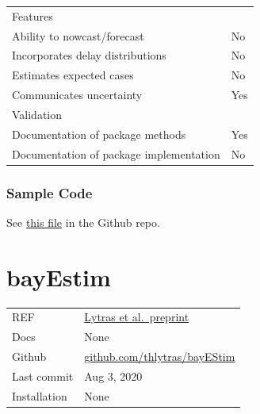 \documentclass[
  letterpaper,
  DIV=11,
  numbers=noendperiod]{scrreprt}
\begin{document}
\begin{longtable}[]{@{}
  >{\raggedright\arraybackslash}p{}
  >{\raggedright\arraybackslash}p{}@{}}
\toprule\noalign{}
\endhead
\bottomrule\noalign{}
\endlastfoot
Features & \\
Ability to nowcast/forecast & No \\
Incorporates delay distributions & No \\
Estimates expected cases & No \\
Communicates uncertainty & Yes \\
Validation & \\
Documentation of package methods & Yes \\
Documentation of package implementation & No \\
\end{longtable}

\subsection*{Sample Code}\label{sample-code}

See
\href{https://github.com/kpzoo/model-selection-for-epidemic-renewal-models/blob/master/apeExamples.R}{this
file} in the Github repo.

\chapter*{bayEstim}\label{bayestim}


\begin{longtable}[]{@{}
  >{\raggedright\arraybackslash}p{}
  >{\raggedright\arraybackslash}p{}@{}}
\toprule\noalign{}
\endhead
\bottomrule\noalign{}
\endlastfoot
REF &
\href{https://www.medrxiv.org/content/10.1101/2020.09.19.20198028v1}{Lytras
et al.~preprint} \\
Docs & None \\
Github &
\href{https://github.com/thlytras/bayEStim}{github.com/thlytras/bayEStim} \\
Last commit & Aug 3, 2020 \\
Installation & None \\
\end{longtable}
\end{document}
